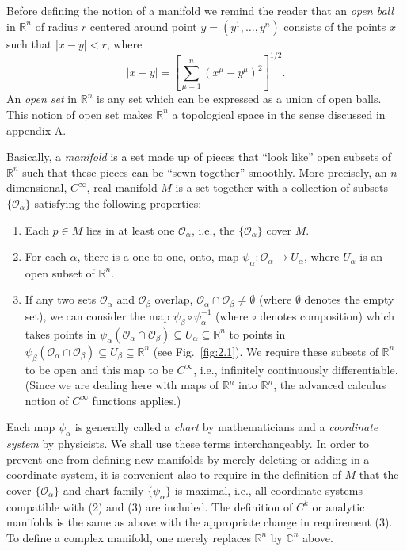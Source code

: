 Before defining the notion of a manifold we remind the reader that an \emph{open
ball} in \(\mathbb{R}^n\) of radius \(r\) centered around point
\(y=(y^1,\ldots,y^n)\) consists of the points \(x\) such that \(\lvert x-y\rvert<r\),
where
\[
  \lvert x-y\rvert =
  \left[\sum_{\mu=1}^n\left(x^\mu-y^\mu\right)^2\right]^{1/2}.
\]
An \emph{open set} in \(\mathbb{R}^n\) is any set which can be expressed as a
union of open balls.  This notion of open set makes \(\mathbb{R}^n\) a topological
space in the sense discussed in appendix A.

Basically, a \emph{manifold} is a set made up of pieces that ``look like'' open
subsets of \(\mathbb{R}^n\) such that these pieces can be ``sewn together''
smoothly.  More precisely, an \(n\)-dimensional, \(C^\infty\), real manifold \(M\)
is a set together with a collection of subsets \(\{\mathcal O_\alpha\}\) satisfying
the following properties:
\begin{enumerate}[label=(\arabic*)]
  \item Each \(p\in M\) lies in at least one \(\mathcal O_\alpha\), i.e., the
    \(\{\mathcal O_\alpha\}\) cover \(M\).
  \item For each \(\alpha\), there is a one-to-one, onto, map
    \(\psi_\alpha:\mathcal O_\alpha\to U_\alpha\), where \(U_\alpha\) is an open
    subset of \(\mathbb{R}^n\).
  \item If any two sets \(\mathcal O_\alpha\) and \(\mathcal O_\beta\) overlap,
    \(\mathcal O_\alpha\cap\mathcal O_\beta\ne\emptyset\) (where \(\emptyset\)
    denotes the empty set), we can consider the map
    \(\psi_\beta\circ\psi_\alpha^{-1}\) (where \(\circ\) denotes composition)
    which takes points in
    \(\psi_\alpha(\mathcal O_\alpha\cap\mathcal O_\beta)\subseteq U_\alpha
    \subseteq\mathbb{R}^n\) to points in
    \(\psi_\beta(\mathcal O_\alpha\cap\mathcal O_\beta)\subseteq U_\beta
    \subseteq\mathbb{R}^n\) (see Fig.~\ref{fig:2.1}).  We require these subsets
    of \(\mathbb{R}^n\) to be open and this map to be \(C^\infty\), i.e.,
    infinitely continuously differentiable.  (Since we are dealing here with maps
    of \(\mathbb{R}^n\) into \(\mathbb{R}^n\), the advanced calculus notion of
    \(C^\infty\) functions applies.)
\end{enumerate}

Each map \(\psi_\alpha\) is generally called a \emph{chart} by mathematicians and
a \emph{coordinate system} by physicists.  We shall use these terms
interchangeably.  In order to prevent one from defining new manifolds by merely
deleting or adding in a coordinate system, it is convenient also to require in the
definition of \(M\) that the cover \(\{\mathcal O_\alpha\}\) and chart family
\(\{\psi_\alpha\}\) is maximal, i.e., all coordinate systems compatible with (2)
and (3) are included.  The definition of \(C^k\) or analytic manifolds is the same
as above with the appropriate change in requirement (3).  To define a complex
manifold, one merely replaces \(\mathbb{R}^n\) by \(\mathbb{C}^n\) above.


